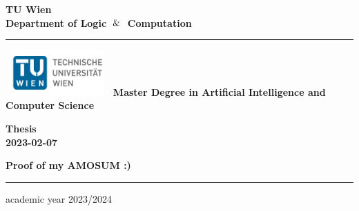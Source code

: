\documentclass[a4paper,12pt,oneside]{book}
\begin{document}
\begin{titlepage}
\begin{center}
\textbf{\LARGE TU Wien}\\
\textbf{Department of Logic $\And$ Computation}\\
\vskip 6pt
\hrule
\vskip 8pt
\includegraphics[width=0.3\textwidth,height=50pt]{logo.jpg}
\vskip 8pt
\textbf{Master Degree in Artificial Intelligence and Computer Science}
\vskip 32pt

\textbf{Thesis}\\
\textbf{2023-02-07}

\vskip 70pt
{ \huge \bfseries Proof of my AMOSUM :) }\\[0.4cm]
\vskip 150pt

\vskip 70pt
\hrule
\vskip 6pt
academic year 2023/2024
\vfill
\end{center}
\end{titlepage}

\tableofcontents

\newpage
\small

\end{document}
